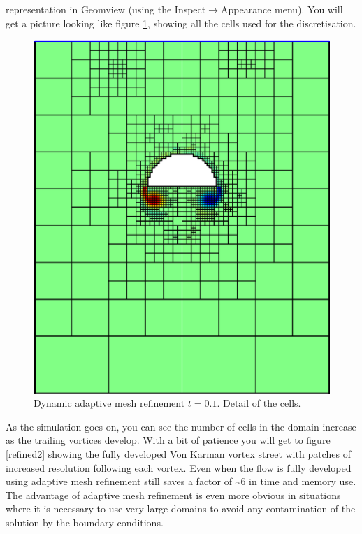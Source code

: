 \documentclass[a4paper]{article}
\begin{document}
representation in Geomview (using the Inspect$\rightarrow$Appearance menu). You
will get a picture looking like figure \ref{refined1-cells}, showing
all the cells used for the discretisation.
\begin{figure}[htbp]
\begin{center}
\includegraphics[angle=90,width=0.6\hsize]{refined1_cells.eps}
\end{center}
\caption{Dynamic adaptive mesh refinement $t=0.1$. Detail of the cells.}
\label{refined1-cells}
\end{figure}
As the simulation goes on, you can see the number of cells in the
domain increase as the trailing vortices develop. With a bit of
patience you will get to figure \ref{refined2} showing the fully
developed Von Karman vortex street with patches of increased
resolution following each vortex. Even when the flow is fully
developed using adaptive mesh refinement still saves a factor of \~{}6 in
time and memory use. The advantage of adaptive mesh refinement is even
more obvious in situations where it is necessary to use very large
domains to avoid any contamination of the solution by the boundary
conditions.
\end{document}
